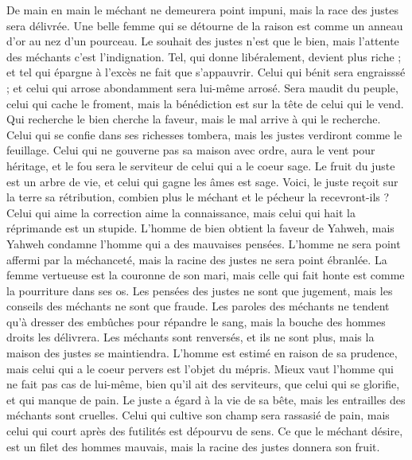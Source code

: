 \begin{multicols}{2}
De main en main le méchant ne demeurera point impuni, mais la race des justes sera délivrée.
Une belle femme qui se détourne de la raison est comme un anneau d'or au nez d'un pourceau.
Le souhait des justes n'est que le bien, mais l'attente des méchants c'est l'indignation.
Tel, qui donne libéralement, devient plus riche ; et tel qui épargne à l'excès ne fait que s'appauvrir.
Celui qui bénit sera engraisssé ; et celui qui arrose abondamment sera lui-même arrosé.
Sera maudit du peuple, celui qui cache le froment, mais la bénédiction est sur la tête de celui qui le vend.
Qui recherche le bien cherche la faveur, mais le mal arrive à qui le recherche.
Celui qui se confie dans ses richesses tombera, mais les justes verdiront comme le feuillage.
Celui qui ne gouverne pas sa maison avec ordre, aura le vent pour héritage, et le fou sera le serviteur de celui qui a le coeur sage.
Le fruit du juste est un arbre de vie, et celui qui gagne les âmes est sage.
Voici, le juste reçoit sur la terre sa rétribution, combien plus le méchant et le pécheur la recevront-ils ?
\VerseOne{}Celui qui aime la correction aime la connaissance, mais celui qui hait la réprimande est un stupide.
L'homme de bien obtient la faveur de Yahweh, mais Yahweh condamne l'homme qui a des mauvaises pensées.
L'homme ne sera point affermi par la méchanceté, mais la racine des justes ne sera point ébranlée.
La femme vertueuse est la couronne de son mari, mais celle qui fait honte est comme la pourriture dans ses os.
Les pensées des justes ne sont que jugement, mais les conseils des méchants ne sont que fraude.
Les paroles des méchants ne tendent qu'à dresser des embûches pour répandre le sang, mais la bouche des hommes droits les délivrera.
Les méchants sont renversés, et ils ne sont plus, mais la maison des justes se maintiendra.
L'homme est estimé en raison de sa prudence, mais celui qui a le coeur pervers est l'objet du mépris.
Mieux vaut l'homme qui ne fait pas cas de lui-même, bien qu'il ait des serviteurs, que celui qui se glorifie, et qui manque de pain.
Le juste a égard à la vie de sa bête, mais les entrailles des méchants sont cruelles.
Celui qui cultive son champ sera rassasié de pain, mais celui qui court après des futilités est dépourvu de sens.
Ce que le méchant désire, est un filet des hommes mauvais, mais la racine des justes donnera son fruit.

\end{multicols}
